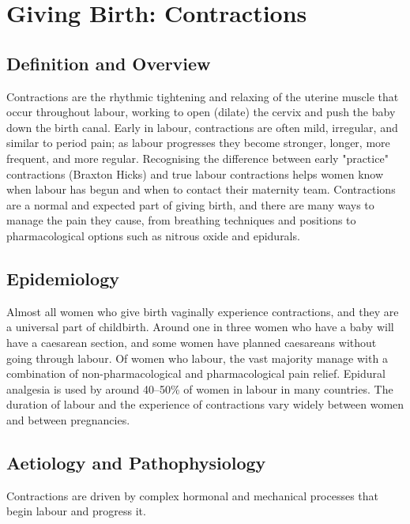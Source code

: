 \chapter{Giving Birth: Contractions}

\section*{Definition and Overview}
Contractions are the rhythmic tightening and relaxing of the uterine muscle that occur throughout labour, working to open (dilate) the cervix and push the baby down the birth canal. Early in labour, contractions are often mild, irregular, and similar to period pain; as labour progresses they become stronger, longer, more frequent, and more regular. Recognising the difference between early "practice" contractions (Braxton Hicks) and true labour contractions helps women know when labour has begun and when to contact their maternity team. Contractions are a normal and expected part of giving birth, and there are many ways to manage the pain they cause, from breathing techniques and positions to pharmacological options such as nitrous oxide and epidurals.

\section*{Epidemiology}
Almost all women who give birth vaginally experience contractions, and they are a universal part of childbirth. Around one in three women who have a baby will have a caesarean section, and some women have planned caesareans without going through labour. Of women who labour, the vast majority manage with a combination of non-pharmacological and pharmacological pain relief. Epidural analgesia is used by around 40--50\% of women in labour in many countries. The duration of labour and the experience of contractions vary widely between women and between pregnancies.

\section*{Aetiology and Pathophysiology}
Contractions are driven by complex hormonal and mechanical processes that begin labour and progress it.


